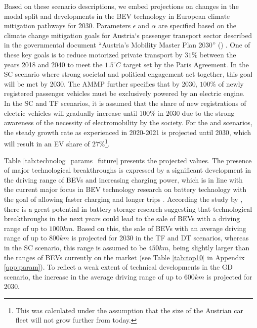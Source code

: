 \documentclass[journal,article,submit,pdftex,moreauthors]{Definitions/mdpi}
\begin{document}
    
    Based on these scenario descriptions, we embed projections on changes in the modal split and developments in the BEV technology in European climate mitigation pathways for 2030.
    Parameters $\epsilon$ and $\alpha$ are specified based on the climate change mitigation goals for Austria`s passenger transport sector described in the governmental document \enquote{Austria's Mobility Master Plan 2030} () \citep{Nachhaltig}. One of these key goals is to reduce motorized private transport by $31\%$ between the years 2018 and 2040 to meet the $1.5^\circ C$ target set by the Paris Agreement. In the SC scenario where strong societal and political engagement act together, this goal will be met by 2030. The AMMP further specifies that by 2030, $100\%$ of newly registered passenger vehicles must be exclusively powered by an electric engine. In the SC and TF scenarios, it is assumed that the share of new registrations of electric vehicles will gradually increase until 100\% in 2030 due to the strong awareness of the necessity of electromobility by the society. For the  and  scenarios, the steady growth rate as experienced in 2020-2021 is projected until 2030, which will result in an EV share of $27\%$\footnote{This was calculated under the assumption that the size of the Austrian car fleet will not grow further from today.}.
    
    Table \ref{tab:technolog_params_future} presents the projected values. The presence of major technological breakthroughs is expressed by a significant development in the driving range of BEVs and increasing charging power, which is in line with the current major focus in BEV technology research on battery technology with the goal of allowing faster charging and longer trips \citep[][]{IRENA2019, Thielmann2020}. According  the study by \citet{Thielmann2020}, there is a great potential in battery storage research suggesting that technological breakthroughs in the next years could lead to the sale of BEVs with a driving range of up to $1000km$.  Based on this, the sale of BEVs with an average driving range of up to $800km$ is projected for 2030 in the TF and DT scenarios, whereas in the SC scenario, this range is assumed to be $450km$, being slightly larger than the ranges of BEVs currently on the market (see Table \ref{tab:top10} in Appendix \ref{app:param}). To reflect a weak extent of technical developments in the GD scenario, the increase in the average driving range of up to $600km$ is projected for 2030.
    
\end{document}
